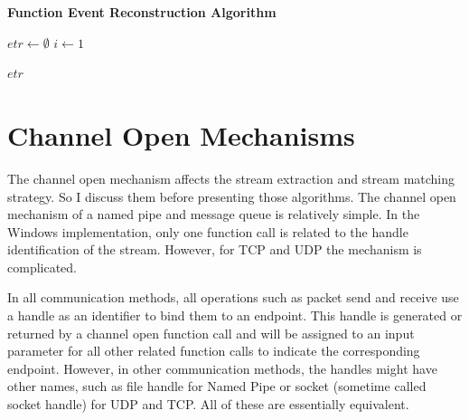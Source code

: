 \begin{algorithm}[H]
\DontPrintSemicolon
\caption{{\bf Function Event Reconstruction Algorithm} \label{eventAlg}}
$etr \leftarrow \emptyset$\; 
$i \leftarrow 1$\;

\KwRet $etr$\;
\end{algorithm} 

\section{Channel Open Mechanisms}\label{mecha}
The channel open mechanism affects the stream extraction and stream matching strategy. So I discuss them before presenting those algorithms. The channel open mechanism of a named pipe and message queue is relatively simple. In the Windows implementation, only one function call is related to the handle identification of the stream. However, for TCP and UDP the mechanism is complicated.

In all communication methods, all operations such as packet send and receive use a handle as an identifier to bind them to an endpoint. This handle is generated or returned by a channel open function call and will be assigned to an input parameter for all other related function calls to indicate the corresponding endpoint. However, in other communication methods, the handles might have other names, such as file handle for Named Pipe or socket (sometime called socket handle) for UDP and TCP. All of these are essentially equivalent.

